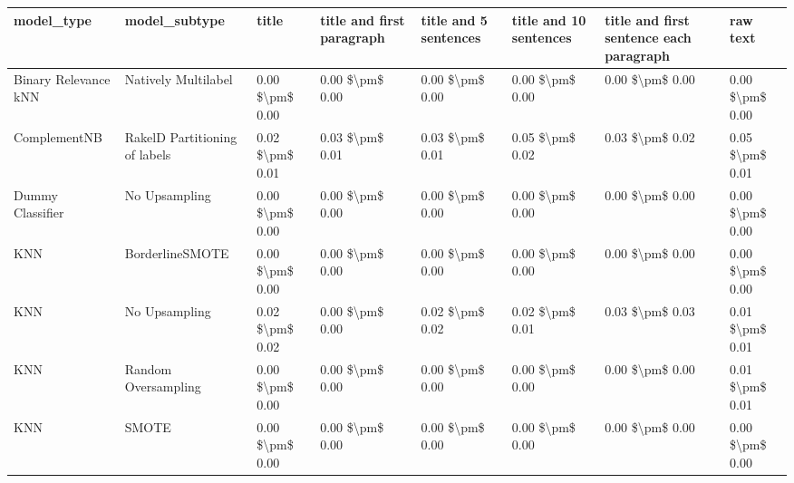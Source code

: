 \begin{tabular}{llllllll}
\toprule
                     model\_type &                 model\_subtype &           title & title and first paragraph & title and 5 sentences & title and 10 sentences & title and first sentence each paragraph &            raw text \\
\midrule
           Binary Relevance kNN &           Natively Multilabel & 0.00 \$\textbackslash pm\$ 0.00 &           0.00 \$\textbackslash pm\$ 0.00 &       0.00 \$\textbackslash pm\$ 0.00 &        0.00 \$\textbackslash pm\$ 0.00 &                         0.00 \$\textbackslash pm\$ 0.00 &     0.00 \$\textbackslash pm\$ 0.00 \\
                   ComplementNB & RakelD Partitioning of labels & 0.02 \$\textbackslash pm\$ 0.01 &           0.03 \$\textbackslash pm\$ 0.01 &       0.03 \$\textbackslash pm\$ 0.01 &        0.05 \$\textbackslash pm\$ 0.02 &                         0.03 \$\textbackslash pm\$ 0.02 &     0.05 \$\textbackslash pm\$ 0.01 \\
               Dummy Classifier &                 No Upsampling & 0.00 \$\textbackslash pm\$ 0.00 &           0.00 \$\textbackslash pm\$ 0.00 &       0.00 \$\textbackslash pm\$ 0.00 &        0.00 \$\textbackslash pm\$ 0.00 &                         0.00 \$\textbackslash pm\$ 0.00 &     0.00 \$\textbackslash pm\$ 0.00 \\
                            KNN &               BorderlineSMOTE & 0.00 \$\textbackslash pm\$ 0.00 &           0.00 \$\textbackslash pm\$ 0.00 &       0.00 \$\textbackslash pm\$ 0.00 &        0.00 \$\textbackslash pm\$ 0.00 &                         0.00 \$\textbackslash pm\$ 0.00 &     0.00 \$\textbackslash pm\$ 0.00 \\
                            KNN &                 No Upsampling & 0.02 \$\textbackslash pm\$ 0.02 &           0.00 \$\textbackslash pm\$ 0.00 &       0.02 \$\textbackslash pm\$ 0.02 &        0.02 \$\textbackslash pm\$ 0.01 &                         0.03 \$\textbackslash pm\$ 0.03 &     0.01 \$\textbackslash pm\$ 0.01 \\
                            KNN &           Random Oversampling & 0.00 \$\textbackslash pm\$ 0.00 &           0.00 \$\textbackslash pm\$ 0.00 &       0.00 \$\textbackslash pm\$ 0.00 &        0.00 \$\textbackslash pm\$ 0.00 &                         0.00 \$\textbackslash pm\$ 0.00 &     0.01 \$\textbackslash pm\$ 0.01 \\
                            KNN &                         SMOTE & 0.00 \$\textbackslash pm\$ 0.00 &           0.00 \$\textbackslash pm\$ 0.00 &       0.00 \$\textbackslash pm\$ 0.00 &        0.00 \$\textbackslash pm\$ 0.00 &                         0.00 \$\textbackslash pm\$ 0.00 &     0.00 \$\textbackslash pm\$ 0.00 \\

\end{tabular}
